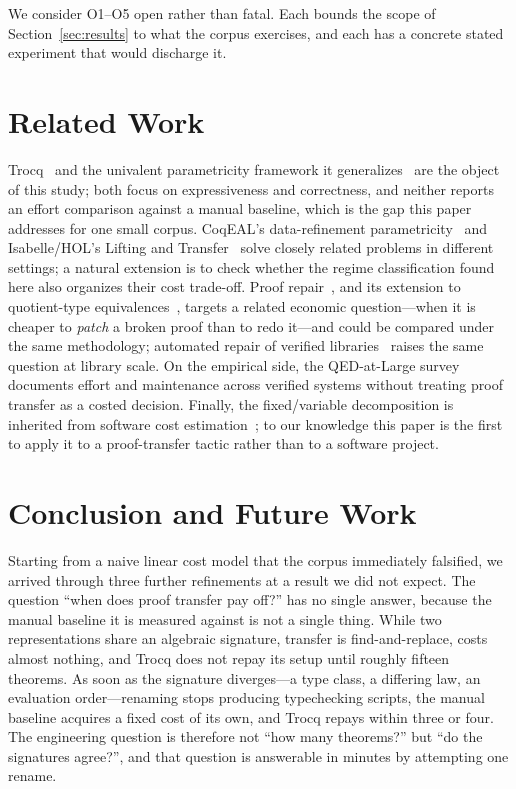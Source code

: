 \documentclass[runningheads]{llncs}
\begin{document}
We consider O1--O5 open rather than fatal. Each bounds the scope of
Section~\ref{sec:results} to what the corpus exercises, and each has a
concrete stated experiment that would discharge it.


\section{Related Work}
\label{sec:related}

Trocq~\cite{cohen2024trocq,cohen2025trocq} and the univalent parametricity
framework it generalizes~\cite{tabareau2018equivalences,tabareau2021marriage}
are the object of this study; both focus on expressiveness and correctness,
and neither reports an effort comparison against a manual baseline, which is
the gap this paper addresses for one small corpus. CoqEAL's data-refinement
parametricity~\cite{cohen2013refinements} and Isabelle/HOL's Lifting and
Transfer~\cite{huffman2013lifting} solve closely related problems in
different settings; a natural extension is to check whether the regime
classification found here also organizes their cost trade-off. Proof
repair~\cite{ringer2018proof,ringer2021proofrepair}, and its extension to
quotient-type equivalences~\cite{viola2025proof}, targets a related economic
question---when it is cheaper to \emph{patch} a broken proof than to redo
it---and could be compared under the same methodology; automated repair of
verified libraries~\cite{gopinathan2023mostly} raises the same question at
library scale. On the empirical side, the QED-at-Large
survey~\cite{ringer2020qed} documents effort and maintenance across verified
systems without treating proof transfer as a costed decision. Finally, the
fixed/variable decomposition is inherited from software cost
estimation~\cite{boehm1981economics}; to our knowledge this paper is the
first to apply it to a proof-transfer tactic rather than to a software
project.


\section{Conclusion and Future Work}
\label{sec:conclusion}

Starting from a naive linear cost model that the corpus immediately
falsified, we arrived through three further refinements at a result we did
not expect. The question ``when does proof transfer pay off?'' has no single
answer, because the manual baseline it is measured against is not a single
thing. While two representations share an algebraic signature, transfer is
find-and-replace, costs almost nothing, and Trocq does not repay its setup
until roughly fifteen theorems. As soon as the signature diverges---a type
class, a differing law, an evaluation order---renaming stops producing
typechecking scripts, the manual baseline acquires a fixed cost of its own,
and Trocq repays within three or four. The engineering question is therefore
not ``how many theorems?'' but ``do the signatures agree?'', and that
question is answerable in minutes by attempting one rename.
\end{document}
